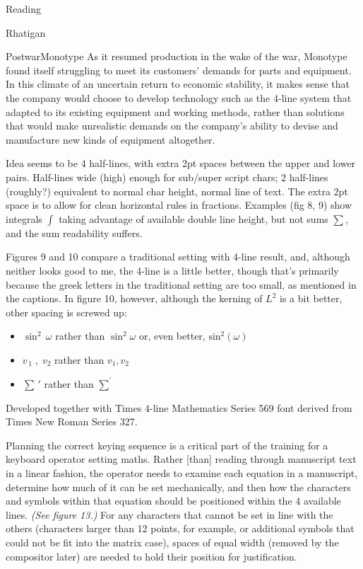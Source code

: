 \documentclass[11pt]{PalisadesLakesBook}
\begin{document}
\begin{plSection}{Reading}
\begin{plSection}{Rhatigan}
\begin{plSection}{}
\begin{plQuote}
{}
{PostwarMonotype}
As it resumed production in the wake of the war,
Monotype found itself struggling to meet its customers'
demands for parts and equipment. 
In this climate of an uncertain return to economic stability,
it makes sense that the company would choose to develop
technology such as the 4-line system that adapted to its existing
equipment and working methods, 
rather than solutions that would make unrealistic demands
on the company's ability to devise and manufacture 
new kinds of equipment altogether. 
\end{plQuote}

Idea seems to be 4 half-lines, with extra 2pt spaces between the 
upper and lower pairs.
Half-lines wide (high) enough for sub/super script chars;
2 half-lines (roughly?) equivalent to normal char height, 
normal line of text.
The extra 2pt space is to allow for clean horizontal rules in
fractions.
Examples (fig 8, 9) show integrals $\int$ 
taking advantage of 
available double line height, but not sums $\sum$,
and the sum readability suffers.

Figures 9 and 10 compare a traditional setting with 4-line result,
and, although neither looks good to me,
the 4-line is a little better,
though that's primarily because the greek letters 
in the traditional setting are too small,
as mentioned in the captions.
In figure 10, however, although the kerning of 
$L^2$ is a bit better, other spacing is screwed up:
\begin{itemize}
\item $\sin^2 \,\omega$ rather than $\sin^{2}\!\omega$ or, even better, 
 $\textrm{sin}^{2}\!\left(\omega\right)$
\item $v_{\,1}\;,\;v_{2}$ rather than $v_{1},v_{2}$
\item $\sum\,'$ rather than $\sum^{'}$
\end{itemize}

Developed together with Times 4-line Mathematics Series 569 font
derived from Times New Roman Series 327. 

\begin{plQuote}{}
{}
Planning the correct keying sequence is a critical part of the
training for a keyboard operator setting maths.
Rather [than] reading through manuscript text 
in a linear fashion,
the operator needs to examine each equation in a manuscript,
determine how much of it can be set mechanically,
and then how the characters and symbols within that equation
should be positioned within the 4 available lines. 
\textit{(See figure 13.)}
For any characters that cannot be set in line with the others
(characters larger than 12 points, for example,
or additional symbols that could not be fit into the matrix case),
spaces of equal width (removed by the compositor later)
are needed to hold their position for justification.
\end{plQuote}


\end{plSection}
\end{plSection}
\end{plSection}
\end{document}
